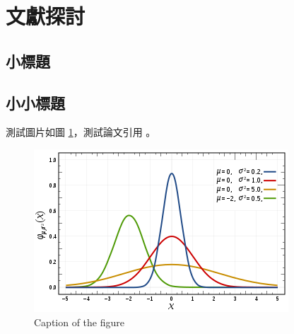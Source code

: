 \section{文獻探討}

\subsection{小標題}

\subsection{小小標題}

測試圖片如圖 \ref{figure:figure_1}，測試論文引用 \cite{Rowe:2005:ASR}。

\begin{figure}[h]
        \centering
        \includegraphics[width=\textwidth]{figures/gambar.png}
        \caption{Caption of the figure}
        \label{figure:figure_1}
\end{figure}
